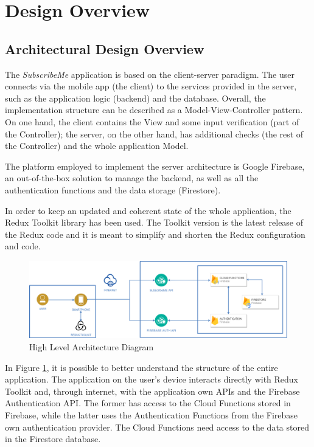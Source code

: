 \documentclass[11pt]{article}
\begin{document}
\newpage
\section{Design Overview}\label{sec:design}
\subsection{Architectural Design Overview}
The \textit{SubscribeMe} application is based on the client-server paradigm. The user connects via the mobile app (the client) to the services provided in the server, such as the application logic (backend) and the database. Overall, the implementation structure can be described as a Model-View-Controller pattern. On one hand, the client contains the View and some input verification (part of the Controller); the server, on the other hand, has additional checks (the rest of the Controller) and the whole application Model.

The platform employed to implement the server architecture is Google Firebase, an out-of-the-box solution to manage the backend, as well as all the authentication functions and the data storage (Firestore).

\noindent In order to keep an updated and coherent state of the whole application, the Redux Toolkit library has been used. The Toolkit version is the latest release of the Redux code and it is meant to simplify and shorten the Redux configuration and code.

\begin{figure}[h]
    \begin{center}
        \includegraphics[width=\textwidth, clip]{../../assets/highLevel.png}
    \end{center}
    \caption{High Level Architecture Diagram}
    \label{fig:highLevel}
\end{figure}

In Figure \ref{fig:highLevel}, it is possible to better understand the structure of the entire application.
The application on the user's device interacts directly with Redux Toolkit and, through internet, with the application own APIs and the Firebase Authentication API. The former has access to the Cloud Functions stored in Firebase, while the latter uses the Authentication Functions from the Firebase own authentication provider. The Cloud Functions need access to the data stored in the Firestore database.
\end{document}

